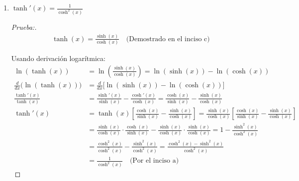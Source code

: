 \documentclass[12pt]{article}
\begin{document}
\begin{enumerate}[\hspace{9px} a)]
    \begin{proof}[Prueba:]
        \begin{equation*}
            \tanh(x) = \frac{e^x-e^{-x}}{e^x+e^{-x}} = \frac{e^x-e^{-x}}{e^x+e^{-x}}\cdot\frac{1/2}{1/2} = \frac{\displaystyle\frac{e^x-e^{-x}}{2}}{\displaystyle\frac{e^x+e^{-x}}{2}} = \frac{\sinh(x)}{\cosh(x)}
        \end{equation*}

        \begin{multline*}
            \tanh^2(x)+\frac{1}{\cosh^2(x)} = \left(\frac{\sinh(x)}{\cosh(x)}\right)^2+\frac{1}{\cosh^2(x)} \\ = \frac{\sinh^2(x)}{\cosh^2(x)}+\frac{1}{\cosh^2(x)} = \frac{\sinh^2(x)+1}{\cosh^2(x)}
        \end{multline*}

        Recordando el inciso a: \(\cosh^2(x)-\sinh^2(x)=1\). Si despejamos \(\cosh^2(x)\) obtenemos: 
        \[\cosh^2(x) = 1+\sinh^2(x)\]

        Sustituyendo:

        \begin{equation*}
            \frac{\sinh^2(x)+1}{\cosh^2(x)} = \frac{\cosh^2(x)}{\cosh^2(x)} = 1
        \end{equation*}
    \end{proof}

    \item \(\tanh'(x)=\displaystyle\frac{1}{\cosh^2(x)}\)
    
    \begin{proof}[Prueba:]
        \begin{align*}
            \tanh(x)=\frac{\sinh(x)}{\cosh(x)} \quad \text{(Demostrado en el inciso c)}
        \end{align*}

        Usando derivaci\'on logar\'itmica:
        \begin{align*}
            \ln(\tanh(x)) &= \ln\left(\frac{\sinh(x)}{\cosh(x)}\right) = \ln(\sinh(x))-\ln(\cosh(x))\\
            \frac{d}{dx}\big(\ln(\tanh(x))\big) &= \frac{d}{dx}\big[\ln(\sinh(x))-\ln(\cosh(x))\big]\\
            \frac{\tanh'(x)}{\tanh(x)} &= \frac{\sinh'(x)}{\sinh(x)} - \frac{\cosh'(x)}{\cosh(x)} =\frac{\cosh(x)}{\sinh(x)} - \frac{\sinh(x)}{\cosh(x)}\\
            \tanh'(x) &= \tanh(x)\left[\frac{\cosh(x)}{\sinh(x)} - \frac{\sinh(x)}{\cosh(x)}\right] = \frac{\sinh(x)}{\cosh(x)}\left[\frac{\cosh(x)}{\sinh(x)} - \frac{\sinh(x)}{\cosh(x)}\right]\\
            &= \frac{\sinh(x)}{\cosh(x)}\cdot\frac{\cosh(x)}{\sinh(x)} - \frac{\sinh(x)}{\cosh(x)}\cdot\frac{\sinh(x)}{\cosh(x)} = 1-\frac{\sinh^2(x)}{\cosh^2(x)}\\
            &= \frac{\cosh^2(x)}{\cosh^2(x)} - \frac{\sinh^2(x)}{\cosh^2(x)} = \frac{\cosh^2(x)-\sinh^2(x)}{\cosh^2(x)}\\
            &= \frac{1}{\cosh^2(x)} \quad \text{(Por el inciso a)}
        \end{align*}
    \end{proof}



\end{enumerate}
\end{document}
